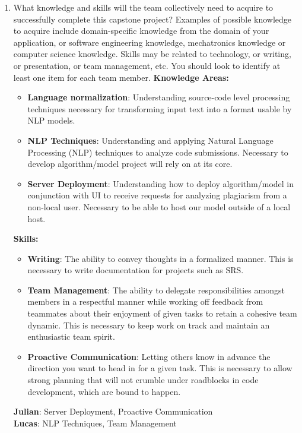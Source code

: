 \documentclass[12pt]{article}
\begin{document}
\begin{enumerate}
  \item What knowledge and skills will the team collectively need to acquire to
  successfully complete this capstone project?  Examples of possible knowledge
  to acquire include domain-specific knowledge from the domain of your
  application, or software engineering knowledge, mechatronics knowledge or
  computer science knowledge.  Skills may be related to technology, or writing,
  or presentation, or team management, etc.  You should look to identify at
  least one item for each team member.
  \textbf{Knowledge Areas:}
    \begin{itemize}
        \item \textbf{Language normalization}: Understanding source-code level processing techniques necessary for transforming input text into a format usable by NLP models.
        \item \textbf{NLP Techniques}: Understanding and applying Natural Language Processing (NLP) techniques to analyze code submissions. Necessary to develop algorithm/model project will rely on at its core.
        \item \textbf{Server Deployment}: Understanding how to deploy algorithm/model in conjunction with UI to receive 
        requests for analyzing plagiarism from a non-local user. Necessary to be able to host our model outside of a local host.
    \end{itemize}
    \textbf{Skills:}
    \begin{itemize}
        \item \textbf{Writing}: The ability to convey thoughts in a formalized manner. This is necessary to write documentation for projects such as SRS.
        \item \textbf{Team Management}: The ability to delegate responsibilities amongst members in a respectful manner while working off feedback from teammates about their enjoyment of given tasks to retain a cohesive team dynamic. This is necessary to keep work on track and maintain an enthusiastic team spirit.
        \item \textbf{Proactive Communication}: Letting others know in advance the direction you want to head in for a given task. This is necessary to allow strong planning that will not crumble under roadblocks in code development, which are bound to happen.
    \end{itemize}
    \textbf{Julian}: Server Deployment, Proactive Communication \\
    \textbf{Lucas}: NLP Techniques, Team Management \\

\end{enumerate}
\end{document}
